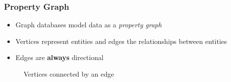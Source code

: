\begin{frame}
  \frametitle{Property Graph}
  \begin{itemize}
  \item Graph databases model data as a \emph{property graph}
  \item Vertices represent entities and edges the relationships between entities
  \item Edges are \textbf{always} directional
  \end{itemize}
  \begin{figure}
    \centering
    
    \caption{Vertices connected by an edge}
  \end{figure}
\end{frame}